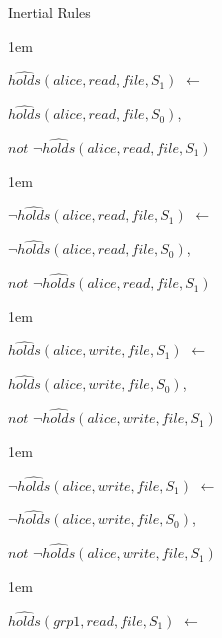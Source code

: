 \documentclass[glov2,twocolumn,final]{svjour2}
\newenvironment{vquote}
  {\begin{list}{}{\leftmargin 1em}\item[]}
  {\end{list}}
\begin{document}
\begin{enumerate}
       \item
         Inertial Rules

         \begin{vquote}
           $\hat{holds}(alice, read, file, S_{1})$ $\leftarrow$

           \hspace{1em}
           $\hat{holds}(alice, read, file, S_{0})$,

           \hspace{1em}
           $not$ $\lnot\hat{holds}(alice, read, file, S_{1})$
         \end{vquote}

         \begin{vquote}
           $\lnot\hat{holds}(alice, read, file, S_{1})$ $\leftarrow$

           \hspace{1em}
           $\lnot\hat{holds}(alice, read, file, S_{0})$,

           \hspace{1em}
           $not$ $\lnot\hat{holds}(alice, read, file, S_{1})$
         \end{vquote}

         \begin{vquote}
           $\hat{holds}(alice, write, file, S_{1})$ $\leftarrow$

           \hspace{1em}
           $\hat{holds}(alice, write, file, S_{0})$,

           \hspace{1em}
           $not$ $\lnot\hat{holds}(alice, write, file, S_{1})$
         \end{vquote}

         \begin{vquote}
           $\lnot\hat{holds}(alice, write, file, S_{1})$ $\leftarrow$

           \hspace{1em}
           $\lnot\hat{holds}(alice, write, file, S_{0})$,

           \hspace{1em}
           $not$ $\lnot\hat{holds}(alice, write, file, S_{1})$
         \end{vquote}

         \begin{vquote}
           $\hat{holds}(grp1, read, file, S_{1})$ $\leftarrow$


\end{vquote}
\end{enumerate}
\end{document}
